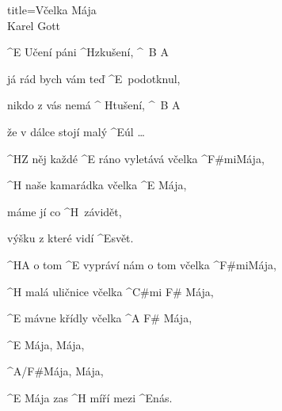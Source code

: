 \begin{song}{title=\predtitle\centering Včelka Mája \\\large Karel Gott  \vspace*{-0.3cm}}  %
\begin{centerjustified}
\nejvetsi

\sloka
	^{E \z}Učení páni ^{\z H}zkušení, ^{\, B A}

	já rád bych vám teď ^{\z E \,}podotknul, 

	nikdo z vás nemá ^{ \z H}tušení, ^{\, B A} 

	že v dálce stojí malý ^{E}úl \dots

	^{H}Z něj každé ^{E \z}ráno vyletává včelka ^{F\#mi}Mája,

	^{H \z}naše kamarádka včelka ^{E \z}Mája,

	máme jí co ^{\z H \,}závidět,
	
	výšku z které vidí ^{E}svět.

	\phantom{\,}

	^{H}A o tom ^{E \z}vypráví nám o tom včelka ^{F\#mi}Mája,

	^{H \z}malá uličnice včelka ^{C\#mi F\# \z}Mája,~~~~~

	^{E \z}mávne křídly včelka ^{A F\# \z}Mája,~~~

	\phantom{\,}

	^{E \z}Mája, Mája,
	
	^{A/F\#}Mája, Mája,

	^{E \z}Mája zas ^{H \z}míří mezi ^{E}nás.

\end{centerjustified}
\setcounter{Slokočet}{0}
\end{song}
